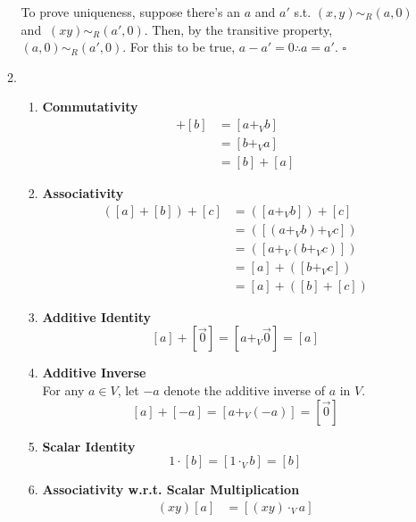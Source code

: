 \documentclass[12pt]{article}
\begin{document}
\begin{enumerate}
\begin{enumerate}
                    To prove uniqueness, suppose there's an $a$ and $a'$ s.t.
                    $(x,y) \sim_R (a,0)$ and $~{(xy) \sim_R (a',0)}$.
                    Then, by the transitive property, $(a,0) \sim_R (a',0)$.
                    For this to be true, $a-a'=0 \therefore a=a'$. $\square$
              \item \begin{enumerate}[label=\arabic*]
                        \item \textbf{Commutativity}
                              \begin{align*}
                                  [a]+[b] & =[a +_V b] \\
                                          & =[b +_V a] \\
                                          & =[b]+[a]
                              \end{align*}
                        \item \textbf{Associativity}
                              \begin{align*}
                                  ([a]+[b])+[c] & =([a +_V b])+[c]     \\
                                                & =([(a +_V b) +_V c]) \\
                                                & =([a +_V (b +_V c)]) \\
                                                & =[a]+([b +_V c])     \\
                                                & =[a]+([b]+[c])
                              \end{align*}
                        \item \textbf{Additive Identity}
                              \[[a]+[\vec{0}] = [a +_V \vec{0}] = [a]\]
                        \item \textbf{Additive Inverse} \\
                              For any $a \in V$, let $-a$ denote the additive inverse of $a$ in $V$.
                              \[[a]+[-a] = [a +_V (-a)]=[\vec{0}]\]
                        \item \textbf{Scalar Identity}
                              \[1 \cdot [b] = [1 \cdot_V b] = [b]\]
                        \item \textbf{Associativity w.r.t. Scalar Multiplication}
                              \begin{align*}
                                  (xy)[a] & = [(xy) \cdot_V a]     \\

\end{align*}
\end{enumerate}
\end{enumerate}
\end{enumerate}
\end{document}
